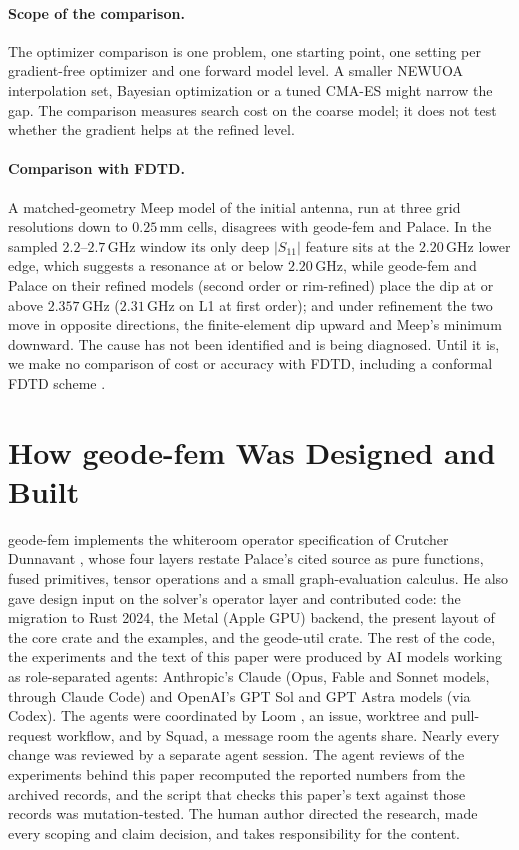 \documentclass{anvil-paper}
\begin{document}
\paragraph{Scope of the comparison.}
The optimizer comparison is one problem, one starting point, one setting
per gradient-free optimizer and one forward model level. A smaller NEWUOA
interpolation set, Bayesian optimization or a tuned CMA-ES might narrow the
gap. The comparison measures search cost on the coarse model; it does not
test whether the gradient helps at the refined level.

\paragraph{Comparison with FDTD.}
A matched-geometry Meep \citep{oskooi2010meep} model of the initial antenna,
run at three grid resolutions down to $0.25$\,mm cells, disagrees with
geode-fem and Palace. In the sampled $2.2$--$2.7$\,GHz window its only deep
$|S_{11}|$ feature sits at the $2.20$\,GHz lower edge, which suggests a
resonance at or below $2.20$\,GHz, while geode-fem and Palace on their
refined models (second order or rim-refined) place the dip at or above
$2.357$\,GHz ($2.31$\,GHz on L1 at first order); and under refinement the two move in opposite directions, the
finite-element dip upward and Meep's minimum downward. The cause has not
been identified and is being diagnosed. Until it is, we make no comparison of
cost or accuracy with FDTD, including a conformal FDTD scheme
\citep{dey1997locally,zagorodnov2003uniformly}.

\section{How geode-fem Was Designed and Built}
\label{sec:built}

geode-fem implements the whiteroom operator specification of Crutcher
Dunnavant \citep{dunnavant2026whiteroom}, whose four layers restate Palace's
cited source as pure functions, fused primitives, tensor operations and a
small graph-evaluation calculus. He also gave design input on the solver's
operator layer and contributed code: the migration to Rust 2024, the Metal
(Apple GPU) backend, the present layout of the core crate and the examples,
and the geode-util crate. The rest of the code, the experiments and the text
of this paper were produced by AI models working as role-separated agents:
Anthropic's Claude (Opus, Fable and Sonnet models, through Claude Code) and
OpenAI's GPT Sol and GPT Astra models (via Codex). The agents were
coordinated by Loom \citep{loom}, an issue, worktree and pull-request
workflow, and by Squad, a message room the agents share. Nearly every
change was reviewed by a separate agent session. The agent reviews of the
experiments behind this paper recomputed the reported numbers from the
archived records, and the script that checks this paper's text against
those records was mutation-tested. The human author directed the research,
made every scoping and claim decision, and takes responsibility for the
content.
\end{document}
